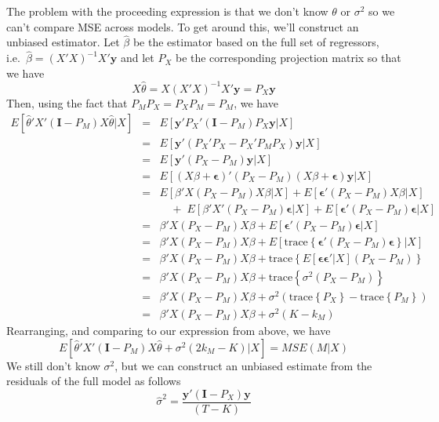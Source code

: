 \documentclass[12pt]{article}
\theoremstyle{definition}
\begin{document}
The problem with the proceeding expression is that we don't know $\theta$ or $\sigma^2$ so we can't compare MSE across models. To get around this, we'll construct an unbiased estimator. Let $\widehat{\beta}$ be the estimator based on the full set of regressors, i.e.\ $\widehat{\beta} = (X'X)^{-1}X'\mathbf{y}$ and let $P_{X}$ be the corresponding projection matrix so that we have 
		$$X \widehat{\theta} = X(X'X)^{-1}X'\mathbf{y} = P_{X}\mathbf{y}$$
Then, using the fact that $P_MP_X = P_XP_M = P_M$, we have
	\begin{eqnarray*}
		E\left[\widehat{\theta}'X'(\mathbf{I} - P_M)X\widehat{\theta} |X\right] &=& E\left[\mathbf{y}'P_X'(\mathbf{I} - P_M)P_{X}\mathbf{y} |X\right]\\
			&=& E\left[\mathbf{y}'(P_X'P_X - P_X'P_MP_X)\mathbf{y} |X\right]\\
			&=& E\left[\mathbf{y}'(P_X - P_M)\mathbf{y} |X\right]\\
			&=& E\left[(X\beta + \boldsymbol{\epsilon})'(P_X - P_M)(X\beta + \boldsymbol{\epsilon})\mathbf{y} |X\right]\\
			&=& E\left[\beta'X(P_X - P_M)X\beta|X\right] + E[\boldsymbol{\epsilon}'(P_X - P_M)X\beta|X] \\
				&& \quad  + \; E[\beta'X'(P_X - P_M)\boldsymbol{\epsilon}|X] + E[\boldsymbol{\epsilon}'(P_X - P_M)\boldsymbol{\epsilon}|X]\\
			&=& \beta'X(P_X - P_M)X\beta +  E[\boldsymbol{\epsilon}'(P_X - P_M)\boldsymbol{\epsilon}|X]\\
			&=& \beta'X(P_X - P_M)X\beta +  E[\mbox{trace}\left\{\boldsymbol{\epsilon}'(P_X - P_M)\boldsymbol{\epsilon}\right\}|X]\\
			&=&\beta'X(P_X - P_M)X\beta +  \mbox{trace}\left\{E[\boldsymbol{\boldsymbol{\epsilon}\epsilon}'|X](P_X - P_M)\right\}\\
			&=&\beta'X(P_X - P_M)X\beta +  \mbox{trace}\left\{\sigma^2(P_X - P_M)\right\}\\ 
			&=&\beta'X(P_X - P_M)X\beta +  \sigma^2 \left(\mbox{trace}\left\{P_X\right\} - \mbox{trace}\left\{P_M\right\}\right)\\ 
			&=& \beta'X(P_X - P_M)X\beta +  \sigma^2 (K - k_M) 
	\end{eqnarray*}
Rearranging, and comparing to our expression from above, we have 
	$$E[\widehat{\theta}'X'(\mathbf{I} - P_M)X\widehat{\theta} +\sigma^2( 2k_M -  K)|X] = MSE(M|X)$$
We still don't know $\sigma^2$, but we can construct an unbiased estimate from the residuals of the full model as follows
	$$\widehat{\sigma}^2 = \frac{\mathbf{y}'(\mathbf{I} - P_X)\mathbf{y}}{(T-K)}$$
\end{document}
